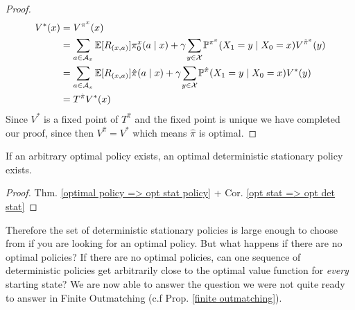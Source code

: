 \begin{proof}
\begin{align*}
		V^*(x)&=V^{\pi^x}(x)\\
		&=\sum_{a\in\cA_x}\E[R_{(x,a)}]\pi_0^x(a\mid x)+\gamma \smashoperator{\sum_{y\in\cX}}\Pr^{\pi^x}(X_1=y\mid X_0=x)
		V^{\tilde{\pi}^x}(y)\\
		&=\sum_{a\in\cA_x}\E[R_{(x,a)}]\hat{\pi}(a\mid x)+\gamma \smashoperator{\sum_{y\in\cX}}\Pr^{\hat{\pi}}(X_1=y\mid X_0=x) V^*(y)\\
		&=T^{\hat{\pi}} V^* (x)
	\end{align*}
	Since \(V^*\) is a fixed point of \(T^{\hat{\pi}}\) and the fixed point is unique we have completed our proof, since then \(V^{\hat{\pi}}=V^*\) which means \(\hat{\pi}\) is optimal. 
\end{proof}
\begin{corollary}
	If an arbitrary optimal policy exists, an optimal deterministic stationary policy exists.
\end{corollary}
\begin{proof}
	Thm. \ref{optimal policy => opt stat policy} + Cor. \ref{opt stat => opt det stat}
\end{proof}

Therefore the set of deterministic stationary policies is large enough to choose from if you are looking for an optimal policy. 
But what happens if there are no optimal policies? If there are no optimal policies, can one sequence of deterministic policies get arbitrarily close to the optimal value function for \emph{every} starting state? We are now able to answer the question we were not quite ready to answer in Finite Outmatching (c.f Prop. \ref{finite outmatching}).

